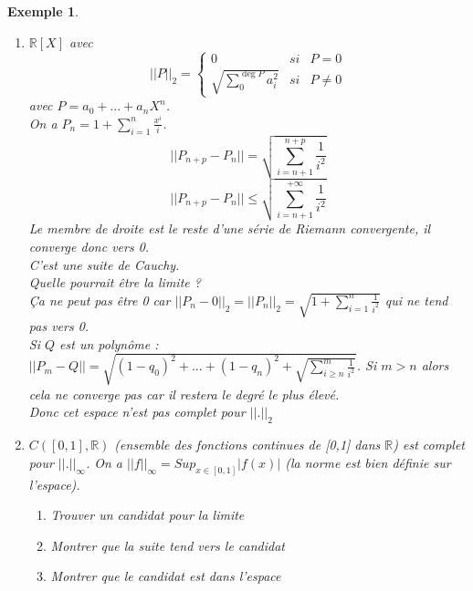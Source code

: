 \documentclass[a4paper, oneside]{report}
\theoremstyle{break}
\newtheorem{exem}[thm]{Exemple}
\newcommand{\R}{\mathbb{R}}
\begin{document}
\begin{exem}
\begin{enumerate}
\item $\R[X]$ avec 
$$||P||_2 = \left\{\begin{array}{lll}
0 &si& P=0\\
\sqrt{\sum_{0}^{\deg P}a_i^2} &si& P\neq 0
\end{array}\right.$$
avec $P=a_0+...+a_nX^n$.\\
On a $P_n=1+\sum_{i=1}^n\frac{x^i}{i}$.\\
$$||P_{n+p}-P_n|| = \sqrt{\sum_{i=n+1}^{n+p}\frac{1}{i^2}}$$
$$||P_{n+p}-P_n|| \leq \sqrt{\sum_{i=n+1}^{+\infty}\frac{1}{i^2}}$$
Le membre de droite est le reste d'une série de Riemann convergente, il converge donc vers 0.\\
C'est une suite de Cauchy.\\
Quelle pourrait être la limite ?\\
Ça ne peut pas être 0 car $||P_n-0||_2=||P_n||_2=\sqrt{1+\sum_{i=1}^{n}\frac{1}{i^2}}$ qui ne tend pas vers 0.\\
Si $Q$ est un polynôme : $||P_m-Q|| = \sqrt{(1-q_0)^2+...+(1-q_n)^2+\sqrt{\sum_{i\geq n}^{m}\frac{1}{i^2}} }$. Si $m>n$ alors cela ne converge pas car il restera le degré le plus élevé.\\
Donc cet espace n'est pas complet pour $||.||_2$

\item $C([0,1],\R)$ (ensemble des fonctions continues de [0,1] dans $\R$) est complet pour $||.||_\infty$. On a $||f||_\infty = Sup_{x\in [0,1]}|f(x)|$ (la norme est bien définie sur l'espace).\\
\begin{enumerate}
\item Trouver un candidat pour la limite
\item Montrer que la suite tend vers le candidat
\item Montrer que le candidat est dans l'espace
\end{enumerate}


\end{enumerate}
\end{exem}
\end{document}
